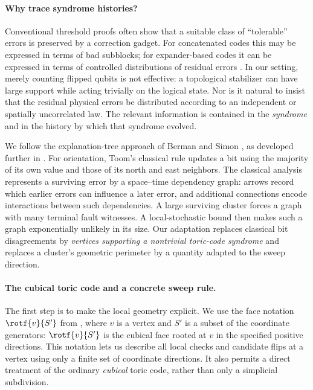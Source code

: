 \paragraph{Why trace syndrome histories?}
Conventional threshold proofs often show that a suitable class of ``tolerable'' errors is preserved by a correction gadget.  For concatenated codes this may be expressed in terms of bad subblocks; for expander-based codes it can be expressed in terms of controlled distributions of residual errors \cite{aharonov1999faulttolerant,grospellier:tel-03364419}.  In our setting, merely counting flipped qubits is not effective: a topological stabilizer can have large support while acting trivially on the logical state.  Nor is it natural to insist that the residual physical errors be distributed according to an independent or spatially uncorrelated law.  The relevant information is contained in the \emph{syndrome} and in the history by which that syndrome evolved.

We follow the explanation-tree approach of Berman and Simon \cite{Berman}, as developed further in \cite{gacs2021newversiontoomsproof}.  For orientation, Toom's classical rule updates a bit using the majority of its own value and those of its north and east neighbors.  The classical analysis represents a surviving error by a space--time dependency graph: arrows record which earlier errors can influence a later error, and additional connections encode interactions between such dependencies.  A large surviving cluster forces a graph with many terminal fault witnesses.  A local-stochastic bound then makes such a graph exponentially unlikely in its size.  Our adaptation replaces classical bit disagreements by \emph{vertices supporting a nontrivial toric-code syndrome} and replaces a cluster's geometric perimeter by a quantity adapted to the sweep direction.

\paragraph{The cubical toric code and a concrete sweep rule.}
The first step is to make the local geometry explicit.  We use the face notation $\rotf{v}{S'}$ from , where $v$ is a vertex and $S'$ is a subset of the coordinate generators: $\rotf{v}{S'}$ is the cubical face rooted at $v$ in the specified positive directions.  This notation lets us describe all local checks and candidate flips at a vertex using only a finite set of coordinate directions.  It also permits a direct treatment of the ordinary \emph{cubical} toric code, rather than only a simplicial subdivision.

